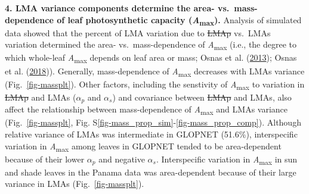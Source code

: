 \documentclass[
  12pt,
  a4paper,
,tablecaptionabove
]{scrartcl}
\providecommand{\DIFaddtex}[1]{{\protect\color{blue}\uwave{#1}}} %
\providecommand{\DIFdeltex}[1]{{\protect\color{red}\sout{#1}}}                      %
\providecommand{\DIFaddbegin}{} %
\providecommand{\DIFaddend}{} %
\providecommand{\DIFdelbegin}{} %
\providecommand{\DIFdelend}{} %
\providecommand{\DIFadd}[1]{\texorpdfstring{\DIFaddtex{#1}}{#1}} %
\providecommand{\DIFdel}[1]{\texorpdfstring{\DIFdeltex{#1}}{}} %
\newcommand{\DIFscaledelfig}{0.5}
\newlength{\DIFdelgraphicswidth} %
\newlength{\DIFdelgraphicsheight} %
\newcommand{\DIFaddincludegraphics}[2][]{{\color{blue}\fbox{\DIFOincludegraphics[#1]{#2}}}} %
\newcommand{\DIFdelincludegraphics}[2][]{%
\sbox{\DIFdelgraphicsbox}{\DIFOincludegraphics[#1]{#2}}%
\settoboxwidth{\DIFdelgraphicswidth}{\DIFdelgraphicsbox} %
\settoboxtotalheight{\DIFdelgraphicsheight}{\DIFdelgraphicsbox} %
\scalebox{\DIFscaledelfig}{%
\parbox[b]{\DIFdelgraphicswidth}{\usebox{\DIFdelgraphicsbox}\\[-\baselineskip] \rule{\DIFdelgraphicswidth}{0em}}\llap{\resizebox{\DIFdelgraphicswidth}{\DIFdelgraphicsheight}{%
\setlength{\unitlength}{\DIFdelgraphicswidth}%
\begin{picture}(1,1)%
\thicklines\linethickness{2pt} %
{\color[rgb]{1,0,0}\put(0,0){\framebox(1,1){}}}%
{\color[rgb]{1,0,0}\put(0,0){\line( 1,1){1}}}%
{\color[rgb]{1,0,0}\put(0,1){\line(1,-1){1}}}%
\end{picture}%
}\hspace*{3pt}}} %
} %
\DeclareRobustCommand{\DIFaddbegin}{\DIFOaddbegin \let\includegraphics\DIFaddincludegraphics} %
\DeclareRobustCommand{\DIFaddend}{\DIFOaddend \let\includegraphics\DIFOincludegraphics} %
\DeclareRobustCommand{\DIFdelbegin}{\DIFOdelbegin \let\includegraphics\DIFdelincludegraphics} %
\DeclareRobustCommand{\DIFdelend}{\DIFOaddend \let\includegraphics\DIFOincludegraphics} %
\begin{document}
\textbf{4. LMA variance components determine the area-
vs.~mass-dependence of leaf photosynthetic capacity
(\emph{A}\textsubscript{max}).} Analysis of simulated data showed that
the percent of LMA variation due to \DIFdelbegin \DIFdel{LMAp }\DIFdelend \DIFaddbegin \DIFadd{LMAm }\DIFaddend vs.~LMAs variation determined
the area- vs.~mass-dependence of \emph{A}\textsubscript{max} (i.e., the
degree to which whole-leaf \emph{A}\textsubscript{max} depends on leaf
area or mass; Osnas et al. (\protect\hyperlink{ref-Osnas2013}{2013});
Osnas et al. (\protect\hyperlink{ref-Osnas2018}{2018})). Generally,
mass-dependence of \emph{A}\textsubscript{max} decreases with LMAs
variance (Fig.~\ref{fig-massplt}). Other factors, including the
senstivity of \emph{A}\textsubscript{max} to variation in \DIFdelbegin \DIFdel{LMAp }\DIFdelend \DIFaddbegin \DIFadd{LMAm }\DIFaddend and LMAs
(\DIFdelbegin \DIFdel{\(\alpha_p\) }\DIFdelend \DIFaddbegin \DIFadd{\(\alpha_m\) }\DIFaddend and \(\alpha_s\)) and covariance between \DIFdelbegin \DIFdel{LMAp }\DIFdelend \DIFaddbegin \DIFadd{LMAm }\DIFaddend and LMAs,
also affect the relationship between mass-dependence of
\emph{A}\textsubscript{max} and LMAs variance (Fig.~\ref{fig-massplt},
Fig. S\ref{fig-mass_prop_sim}-\ref{fig-mass_prop_comp}). Although
relative variance of LMAs was intermediate in GLOPNET (51.6\%),
interspecific variation in \emph{A}\textsubscript{max} among leaves in
GLOPNET tended to be area-dependent because of their lower \DIFdelbegin \DIFdel{\(\alpha_p\)
}\DIFdelend \DIFaddbegin \DIFadd{\(\alpha_m\)
}\DIFaddend and negative \(\alpha_s\). Interspecific variation in
\emph{A}\textsubscript{max} in sun and shade leaves in the Panama data
was area-dependent because of their large variance in LMAs
(Fig.~\ref{fig-massplt}).
\end{document}
